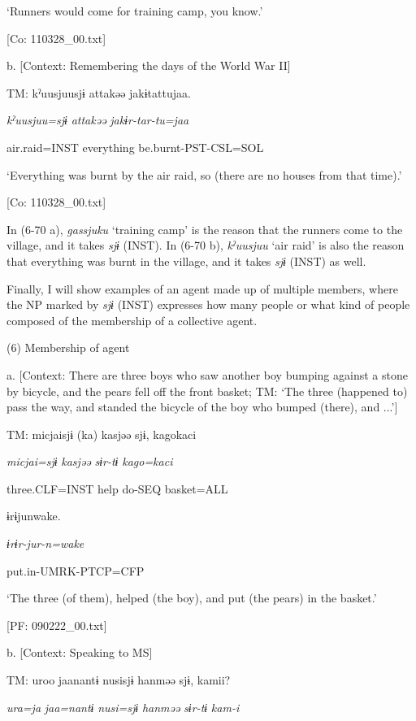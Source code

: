       ‘Runners would come for training camp, you know.’

      [Co: 110328\_00.txt]

  b.  [Context: Remembering the days of the World War II]

    TM:  kˀuusjuusjɨ  attakəə  jakɨtattujaa.

      \textit{kˀuusjuu=sjɨ}  \textit{attakəə}  \textit{jakɨr-tar-tu=jaa}

      air.raid=INST  everything  be.burnt-PST-CSL=SOL

      ‘Everything was burnt by the air raid, so (there are no houses from that time).’

      [Co: 110328\_00.txt]

In (6-70 a), \textit{gassjuku} ‘training camp’ is the reason that the runners come to the village, and it takes \textit{sjɨ} (INST). In (6-70 b), \textit{kˀuusjuu} ‘air raid’ is also the reason that everything was burnt in the village, and it takes \textit{sjɨ} (INST) as well.

Finally, I will show examples of an agent made up of multiple members, where the NP marked by \textit{sjɨ} (INST) expresses how many people or what kind of people composed of the membership of a collective agent.

(6)  Membership of agent

  a.  [Context: There are three boys who saw another boy bumping against a stone by bicycle, and the pears fell off the front basket; TM: ‘The three (happened to) pass the way, and standed the bicycle of the boy who bumped (there), and ...’]

    TM:  micjaisjɨ  (ka)  kasjəə  sjɨ,  kagokaci

      \textit{micjai=sjɨ}    \textit{kasjəə}  \textit{sɨr-tɨ}  \textit{kago=kaci}

      three.CLF=INST    help  do-SEQ  basket=ALL

      ɨrɨjunwake.

      \textit{ɨrɨr-jur-n=wake}

      put.in-UMRK-PTCP=CFP

      ‘The three (of them), helped (the boy), and put (the pears) in the basket.’

      [PF: 090222\_00.txt]

  b.  [Context: Speaking to MS]

    TM:  uroo  jaanantɨ  nusisjɨ  hanməə  sjɨ,  kamii?

      \textit{ura=ja}  \textit{jaa=nantɨ}  \textit{nusi=sjɨ}  \textit{hanməə}  \textit{sɨr-tɨ}  \textit{kam-i}

